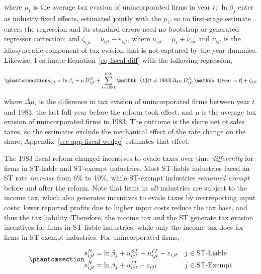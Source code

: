 \documentclass[
  12pt,
  letterpaper,
  oneside,
  openany]{report}
\begin{document}
where \(\mu_{t}\) is the average tax evasion of unincorporated firms in
year \(t\); \(\ln\beta_j\) enter as industry fixed effects, estimated
jointly with the \(\mu_t\), so no first-stage estimate enters the
regression and its standard errors need no bootstrap or
generated-regressor correction; and
\(\zeta_{ijt}=\nu_{ijt}-\varepsilon_{ijt}\), where
\(u_{ijt} = \mu_t + \nu_{ijt}\) and \(\nu_{ijt}\) is the idiosyncratic
component of tax evasion that is not captured by the year dummies.
Likewise, I estimate Equation~\ref{eq-fiscal-diff} with the following
regression,

\begin{equation}\protect\phantomsection\label{eq-fiscal-diff-reg}{
    s_{ijt} = \ln\beta_j + \mu\, D_{ijt}^N+\sum_{t=1981}^{1991} \mathbb{1}[t\neq1983]\,\Delta\mu_t\, D_{ijt}^N\,\mathbb 1[\text{year}=t] + \zeta_{ijt}
}\end{equation}

where \(\Delta\mu_{t}\) is the difference in tax evasion of
unincorporated firms between year \(t\) and 1983, the last full year
before the reform took effect, and \(\mu\) is the average tax evasion of
unincorporated firms in 1983. The outcome is the share net of sales
taxes, so the estimates exclude the mechanical effect of the rate change
on the share; Appendix~\ref{sec-app-fiscal-wedge} estimates that effect.

The 1983 fiscal reform changed incentives to evade taxes over time
\emph{differently} for firms in ST-liable and ST-exempt industries. Most
ST-liable industries faced an ST rate \emph{increase} from 6\% to 10\%,
while ST-exempt industries \emph{remained exempt} before and after the
reform. Note that firms in \emph{all} industries are subject to the
income tax, which also generates incentives to evade taxes by
overreporting input costs: lower reported profits due to higher input
costs reduce the tax base, and thus the tax liability. Therefore, the
income tax and the ST generate tax evasion incentives for firms in
ST-liable industries, while only the income tax does for firms in
ST-exempt industries. For unincorporated firms,

\begin{equation}\protect\phantomsection\label{eq-fiscal-noncorp}{
\begin{aligned}
s_{ijt}^{N} &= \ln\beta_j + u^{ST}_{ijt} + u^{IT}_{ijt}-\varepsilon_{ijt} & j &\in \text{ST-Liable} \\
s_{ijt}^{N} &= \ln\beta_j + u^{IT}_{ijt}-\varepsilon_{ijt} & j &\in \text{ST-Exempt}
\end{aligned}
}\end{equation}
\end{document}

